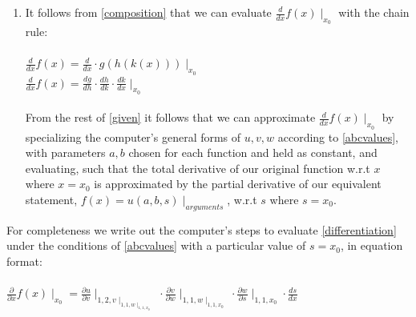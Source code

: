 \documentclass[preprint,12pt]{elsarticle}
\begin{document}
\begin{enumerate}
\item 
\label{differentiation}
It follows from \ref{composition} that we can evaluate $\frac{d}{d x}f(x) \mid_{x_0}$ with the chain rule: \\ \\
$\frac{d}{d x}f(x) = \frac{d}{d x} \cdot g(h(k(x))) \mid_{x_0}$ \\
$\frac{d}{d x}f(x) =  \frac{d{g}}{d{h}} \cdot \frac{d{h}}{d{k}}
\cdot \frac{d{k}}{d{x}}\mid_{x_0}$ \\ \\
From the rest of \ref{given} it follows that we can approximate  $\frac{d}{d x}f(x) \mid_{x_0}$ by
specializing the computer's general forms of $u, v, w$ 
according to \ref{abcvalues}, with parameters $a, b$ chosen for each function and held as constant, and
evaluating, such that the total derivative of our original function w.r.t $x$ where $x = x_0$ is approximated
by the partial derivative of our equivalent statement, $f(x) = u(a, b, s) \mid_{arguments}$,  w.r.t $s$ 
where $s = x_0$. \\

\end{enumerate}
\label{doingthework}
For completeness we write out the computer's steps to evaluate \ref{differentiation} under the conditions of
\ref{abcvalues} with a particular value of $s = x_0$, in equation format: \\ \\
$\frac{\partial}{\partial x}f(x) \mid _{x_0} = \frac{\partial{u}}{\partial{v}} \mid _{1, 2, v \mid _{1, 1, w \mid _{ 1, 1, x_0}}} \cdot \frac{\partial{v}}{\partial{w}} \mid _{1,1, w \mid _{1, 1, x_0}} \cdot \frac{\partial{w}}{\partial{s}} \mid _{1, 1, x_0} \cdot \frac{ds}{dx}$\\ \\
\end{document}
